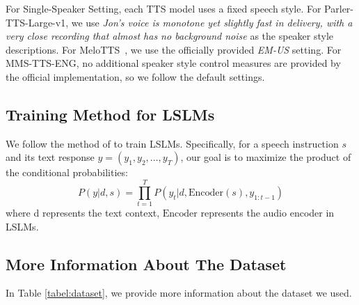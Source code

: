 \documentclass[11pt]{article}
\begin{document}
	For Single-Speaker Setting, each TTS model uses a fixed speech style. For Parler-TTS-Large-v1, we use \textit{Jon's voice is monotone yet slightly fast in delivery, with a very close recording that almost has no background noise} as the speaker style descriptions. For MeloTTS~\citep{zhao2024melo}, we use the officially provided \textit{EM-US} setting. For MMS-TTS-ENG, no additional speaker style control measures are provided by the official implementation, so we follow the default settings.


	\subsection{Training Method for LSLMs}\label{appendix:train_method}
	We follow the method of \citep{chu2023qwenaudioadvancinguniversalaudio} to train LSLMs.  Specifically, for a speech instruction   $s$  and its text response  $y = (y_1, y_2, \dots, y_T)$, our goal is to maximize the product of the conditional probabilities:
	$$
	P(y|d,s) = \prod_{t=1}^{T} P(y_t | d, \text{Encoder}(s), y_{1:t-1})
	$$
	where  d  represents the text context, $\text{Encoder}$ represents the audio encoder in LSLMs.
	
	
	\subsection{More Information About The Dataset}\label{appendix:more_dataset}
	
	In Table \ref{tabel:dataset}, we provide more information about the dataset we used.
	
\end{document}
